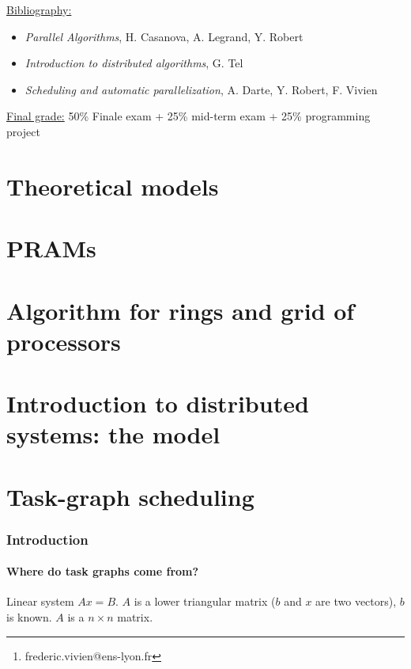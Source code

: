 \documentclass{article}
\title{}
\author{Frederic Vivien\footnote{frederic.vivien@ens-lyon.fr}\\
\small ENS de Lyon}
\date{}
\newcommand{\note}{\medskip\noindent\underline}
\begin{document}
\maketitle
\tableofcontents
\newpage


\note{Bibliography:}
\begin{itemize}
\item \textit{Parallel Algorithms}, H. Casanova, A. Legrand, Y. Robert
\item \textit{Introduction to distributed algorithms}, G. Tel
\item \textit{Scheduling and automatic parallelization}, A. Darte, Y. Robert, F. Vivien
\end{itemize}


\note{Final grade:} 50\% Finale exam + 25\% mid-term exam + 25\% programming project

\part{Theoretical models}


\newpage
\setcounter{section}{0}
\part{PRAMs}


\newpage
\setcounter{section}{0}
\part{Algorithm for rings and grid of processors}


\setcounter{section}{0}
\part{Introduction to distributed systems: the model}


\setcounter{section}{0}
\part{Task-graph scheduling}
\section{Introduction}
\subsection*{Where do task graphs come from?}
Linear system $Ax=B$. $A$ is a lower triangular matrix ($b$ and $x$ are two vectors), $b$ is known. $A$ is a $n \times n$ matrix.
\end{document}
